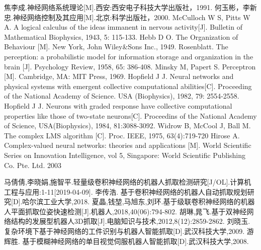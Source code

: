 \documentclass[no-math,bwprint]{YangThesis}
\begin{document}
\begin{thebibliography}{9}
 焦李成.神经网络系统理论[M].西安:西安电子科技大学出版社，1991.
 何玉彬，李新忠.神经网络控制及其应用[M].北京:科学出版社，2000.
 McCulloch W S, Pitts W A. A logical calculus of the ideas immanent in nervous activity[J]. Bulletin of Mathematical Biophysics, 1943, 5: 115-133.
 Hebb D O. The Organization of Behaviour [M]. New York, John Wiley\&Sons Inc., 1949.
 Rosenblatt. The perception: a probabilistic model for information storage and organization in the brain [J]. Psychology Review, 1958, 65: 386-408.
 Minsky M, Papert S. Perceptron [M]. Cambridge, MA: MIT Press, 1969.
 Hopfield  J  J.  Neural  networks  and  physical  systems  with  emergent  collective computational  abilities[C].  Proceeding  of the National Academy  of  Science.  USA (Biophysics), 1982, 79: 2554-2558.
 Hopfield J J. Neurons with graded response have collective computational properties like those  of  two-state  neurons[C].  Proceedins  of  the  National  Academy  of  Science, USA(Biophysics), 1984, 81:3088-3092.
 Widrow B, McCool J, Ball M. The complex LMS algorithm [C]. Proc. IEEE, 1975, 63(4):719-720
 Hirose  A.  Complex-valued  neural  networks:  theories  and  applications  [M].  World Scientific Series on Innovation Intelligence, vol 5, Singapore: World Scientific Publishing Co. Pte. Ltd. 2003



  马倩倩,李晓娟,施智平.轻量级卷积神经网络的机器人抓取检测研究[J/OL].计算机工程与应用:1-11[2019-04-09].
  李传浩. 基于卷积神经网络的机器人自动抓取规划研究[D].哈尔滨工业大学,2018.
  夏晶,钱堃,马旭东,刘环.基于级联卷积神经网络的机器人平面抓取位姿快速检测[J].机器人,2018,40(06):794-802.
  胡琳,晁飞.基于双神经网络结构的发展型机器人3D抓取[J].电脑知识与技术,2012,8(12):2859-2862.
 刘晓玉. 复杂环境下基于神经网络的工件识别与机器人智能抓取[D].武汉科技大学,2009.
 游辉胜. 基于模糊神经网络的单目视觉伺服机器人智能抓取[D].武汉科技大学,2008.
\end{thebibliography}
\end{document}
